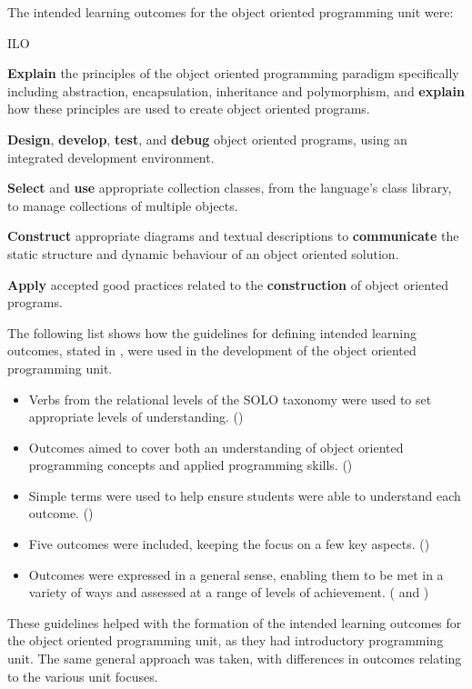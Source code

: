 The intended learning outcomes for the object oriented programming unit were:
\begin{guidelines}{ILO}
	\item \textbf{Explain} the principles of the object oriented programming paradigm specifically including abstraction, encapsulation, inheritance and polymorphism, and \textbf{explain} how these principles are used to create object oriented programs.
	\item \textbf{Design}, \textbf{develop}, \textbf{test}, and \textbf{debug} object oriented programs, using an integrated development environment.
	\item \textbf{Select} and \textbf{use} appropriate collection classes, from the language's class library, to manage collections of multiple objects.
	\item \textbf{Construct} appropriate diagrams and textual descriptions to \textbf{communicate} the static structure and dynamic behaviour of an object oriented solution.
	\item \textbf{Apply} accepted good practices related to the \textbf{construction} of object oriented programs.
\end{guidelines}

The following list shows how the guidelines for defining intended learning outcomes, stated in , were used in the development of the object oriented programming unit.

\begin{itemize}[noitemsep,nolistsep]
	\item Verbs from the relational levels of the SOLO taxonomy were used to set appropriate levels of understanding. () 
	\item Outcomes aimed to cover both an understanding of object oriented programming concepts and applied programming skills. ()
	\item Simple terms were used to help ensure students were able to understand each outcome. ()
	\item Five outcomes were included, keeping the focus on a few key aspects. ()
	\item Outcomes were expressed in a general sense, enabling them to be met in a variety of ways and assessed at a range of levels of achievement. ( and )
\end{itemize}

These guidelines helped with the formation of the intended learning outcomes for the object oriented programming unit, as they had introductory programming unit. The same general approach was taken, with differences in outcomes relating to the various unit focuses.


